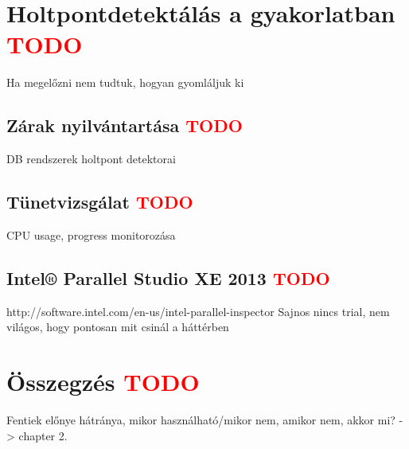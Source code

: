 \section{Holtpontdetektálás a gyakorlatban \textcolor{red}{TODO}} 
\label{sec:dl-avoiding}
Ha megelőzni nem tudtuk, hogyan gyomláljuk ki
    \subsection{Zárak nyilvántartása \textcolor{red}{TODO}} DB rendszerek holtpont detektorai
    \subsection{Tünetvizsgálat \textcolor{red}{TODO}} CPU usage, progress monitorozása
    \subsection{Intel® Parallel Studio XE 2013 \textcolor{red}{TODO}} http://software.intel.com/en-us/intel-parallel-inspector Sajnos nincs trial, nem világos, hogy pontosan mit csinál a háttérben
    
\section{Összegzés \textcolor{red}{TODO}} 
Fentiek előnye hátránya, mikor használható/mikor nem, amikor nem, akkor mi? -> chapter 2.
